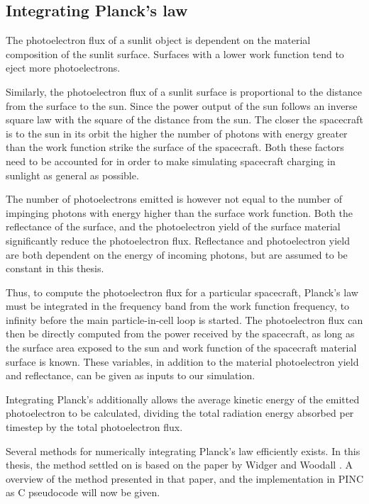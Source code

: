 \subsection{Integrating Planck's law}

The photoelectron flux of a sunlit object is dependent on the material composition of the sunlit surface. Surfaces with a lower work function tend to eject more photoelectrons.

Similarly, the photoelectron flux of a sunlit surface is proportional to the distance from the surface to the sun. Since the power output of the sun follows an inverse square law with the square of the distance from the sun. The closer the spacecraft is to the sun in its orbit the higher the number of photons with energy greater than the work function strike the surface of the spacecraft. Both these factors need to be accounted for in order to make simulating spacecraft charging in sunlight as general as possible. 

The number of photoelectrons emitted is however not equal to the number of impinging photons with energy higher than the surface work function. Both the reflectance of the surface, and the photoelectron yield of the surface material significantly reduce the photoelectron flux. Reflectance and photoelectron yield are both dependent on the energy of incoming photons, but are assumed to be constant in this thesis.

Thus, to compute the photoelectron flux for a particular spacecraft, Planck's law must be integrated in the frequency band from the work function frequency, to infinity before the main particle-in-cell loop is started. The photoelectron flux can then be directly computed from the power received by the spacecraft, as long as the surface area exposed to the sun and work function of the spacecraft material surface is known. These variables, in addition to the material photoelectron yield and reflectance, can be given as inputs to our simulation.

Integrating Planck's additionally allows the average kinetic energy of the emitted photoelectron to be calculated, dividing the total radiation energy absorbed per timestep by the total photoelectron flux.

Several methods for numerically integrating Planck's law efficiently exists. In this thesis, the method settled on is based on the paper by Widger and Woodall \parencite{Widger1976}. A overview of the method presented in that paper, and the implementation in PINC as C pseudocode will now be given.

